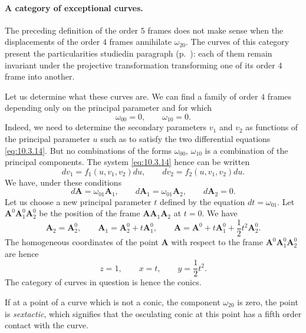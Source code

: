 \paragraph{A category of exceptional curves.}
\label{sec:147}
The preceding definition of the order $5$ frames does not make sense when the displacements of the order $4$ frames annihilate $\omega_{20}$. The curves of this category present the particularities studiedin paragraph  (p.~\pageref{sec:132}): each of them remain invariant under the projective transformation transforming one of its order $4$ frame into another.

Let us determine what these curves are. We can find a family of order $4$ frames depending only on the principal parameter and for which
\begin{equation}
  \label{eq:10.3.14}
  \omega_{00}=0,\qquad\omega_{10}=0.
\end{equation}
Indeed, we need to determine the secondary parameters $v_{1}$ and $v_{2}$ as functions of the principal parameter $u$ such as to satisfy the two differential equations \eqref{eq:10.3.14}. But no combinations of the forms $\omega_{00}$, $\omega_{10}$ is a combination of the principal components. The system \eqref{eq:10.3.14} hence can be written
\[
dv_{1}=f_{1}(u,v_{1},v_{2})du,\qquad dv_{2}=f_{2}(u,v_{1},v_{2})du.
\]
We have, under these conditions
\[
d\mathbf{A}=\omega_{01}\mathbf{A}_{1},\qquad d\mathbf{A}_{1}=\omega_{01}\mathbf{A}_{2},\qquad d\mathbf{A}_{2}=0.
\]
Let us choose a new principal parameter $t$ defined by the equation $dt=\omega_{01}$. Let $\mathbf{A}^{0}\mathbf{A}^{0}_{1}\mathbf{A}^{0}_{2}$ be the position of the frame $\mathbf{AA}_{1}\mathbf{A}_{2}$ at $t=0$. We have
\[
\mathbf{A}_{2}=\mathbf{A}^{0}_{2},\qquad\mathbf{A}_{1}=\mathbf{A}^{0}_{2}+t\mathbf{A}^{0}_{1},\qquad\mathbf{A}=\mathbf{A}^{0}+t\mathbf{A}^{0}_{1}+\frac{1}{2}t^{2}\mathbf{A}^{0}_{2}.
\]
The homogeneous coordinates of the point $\mathbf{A}$ with respect to the frame $\mathbf{A}^{0}\mathbf{A}^{0}_{1}\mathbf{A}^{0}_{2}$ are hence
\[
z=1,\qquad x=t,\qquad y=\frac{1}{2}t^{2}.
\] 
The category of curves in question is hence the conics.

If at a point of a curve which is not a conic, the component $\omega_{20}$ is zero, the point is \emph{sextactic}, which signifies that the osculating conic at this point has a fifth order contact with the curve.




